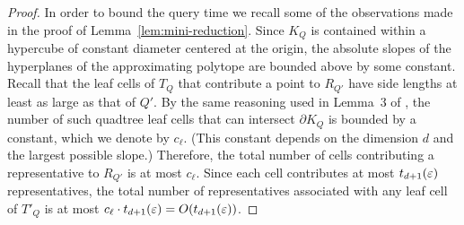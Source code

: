 \documentclass[11pt]{article}   \usepackage[letterpaper,hmargin=2.1cm,vmargin=3cm]{geometry}
\begin{document}
\begin{proof}
In order to bound the query time we recall some of the observations made in the proof of Lemma~\ref{lem:mini-reduction}. Since $K_Q$ is contained within a hypercube of constant diameter centered at the origin, the absolute slopes of the hyperplanes of the approximating polytope are bounded above by some constant. Recall that the leaf cells of $T_Q$ that contribute a point to $R_{Q'}$ have side lengths at least as large as that of $Q'$. By the same reasoning used in Lemma~{3} of \cite{ARS}, the number of such quadtree leaf cells that can intersect $\partial K_Q$ is bounded by a constant, which we denote by $c_{\ell}$. (This constant depends on the dimension $d$ and the largest possible slope.) Therefore, the total number of cells contributing a representative to $R_{Q'}$ is at most $c_{\ell}$. Since each cell contributes at most $t_{d+1}(\varepsilon)$ representatives, the total number of representatives associated with any leaf cell of $T'_Q$ is at most $c_{\ell} \cdot t_{d+1}(\varepsilon) = O(t_{d+1}(\varepsilon))$.


\end{proof}
\end{document}
